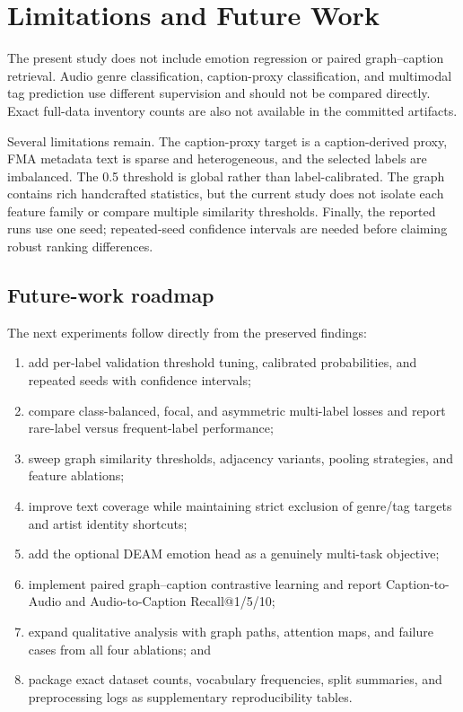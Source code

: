 \documentclass[conference]{IEEEtran}
\begin{document}
\section{Limitations and Future Work}
The present study does not include emotion regression or paired
graph--caption retrieval. Audio genre classification, caption-proxy
classification, and multimodal tag prediction use different supervision and
should not be compared directly. Exact full-data inventory counts are also
not available in the committed artifacts.

Several limitations remain. The caption-proxy target is a
caption-derived proxy, FMA metadata text is sparse and heterogeneous, and
the selected labels are imbalanced. The 0.5 threshold is global rather
than label-calibrated. The graph contains rich handcrafted statistics, but
the current study does not isolate each feature family or compare multiple
similarity thresholds. Finally, the reported runs use one seed; repeated-seed
confidence intervals are needed before claiming robust ranking differences.

\subsection{Future-work roadmap}
The next experiments follow directly from the preserved findings:
\begin{enumerate}
\item add per-label validation threshold tuning, calibrated probabilities,
and repeated seeds with confidence intervals;
\item compare class-balanced, focal, and asymmetric multi-label losses and
report rare-label versus frequent-label performance;
\item sweep graph similarity thresholds, adjacency variants, pooling
strategies, and feature ablations;
\item improve text coverage while maintaining strict exclusion of genre/tag
targets and artist identity shortcuts;
\item add the optional DEAM emotion head as a genuinely multi-task objective;
\item implement paired graph--caption contrastive learning and report
Caption-to-Audio and Audio-to-Caption Recall@1/5/10;
\item expand qualitative analysis with graph paths, attention maps, and
failure cases from all four ablations; and
\item package exact dataset counts, vocabulary frequencies, split summaries,
and preprocessing logs as supplementary reproducibility tables.
\end{enumerate}
\end{document}
